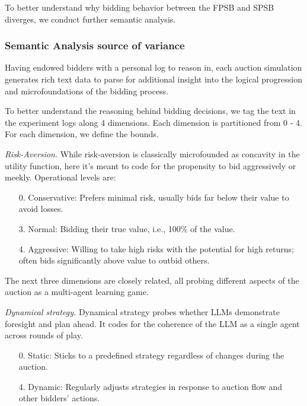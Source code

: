 \documentclass{article} %
\begin{document}
To better understand why bidding behavior between the FPSB and SPSB diverges, we conduct further semantic analysis.

\subsubsection{Semantic Analysis source of variance}
Having endowed bidders with a personal log to reason in, each auction simulation generates rich text data to parse for additional insight into the logical progression and microfoundations of the bidding process.

To better understand the reasoning behind bidding decisions, we tag the text in the experiment logs along 4 dimensions. 
Each dimension is partitioned from 0 - 4. 
For each dimension, we define the bounds.

\textit{Risk-Aversion.} While risk-aversion is classically microfounded as concavity in the utility function, here it's meant to code for the propensity to bid aggressively or meekly. Operational levels are: 
\begin{enumerate}
    \item[0.] Conservative: Prefers minimal risk, usually bids far below their value to avoid losses.
    \item[3. ] Normal: Bidding their true value, i.e., 100\% of the value. 
    \item[4. ] Aggressive: Willing to take high risks with the potential for high returns; often bids significantly above value to outbid others.   
\end{enumerate}

The next three dimensions are closely related, all probing different aspects of the auction as a multi-agent learning game. 

\textit{Dynamical strategy.}
Dynamical strategy probes whether LLMs demonstrate foresight and plan ahead. 
It codes for the coherence of the LLM as a single agent across rounds of play. 
\begin{enumerate}
    \item[0.] Static: Sticks to a predefined strategy regardless of changes during the auction.
    \item[4.] Dynamic: Regularly adjusts strategies in response to auction flow and other bidders’ actions.
\end{enumerate}
\end{document}
